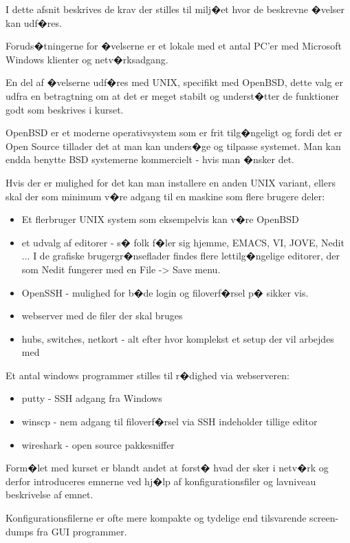 \documentclass[a4paper,11pt,notitlepage]{oevelser}
\begin{document}
I dette afsnit beskrives de krav der stilles til milj�et hvor de
beskrevne �velser kan udf�res.

Foruds�tningerne for �velserne er et lokale med et antal PC'er
med Microsoft Windows klienter og netv�rksadgang.

En del af �velserne udf�res med UNIX, specifikt med OpenBSD, dette
valg er udfra en betragtning om at det er meget stabilt og
underst�tter de funktioner godt som beskrives i kurset.

OpenBSD er et moderne operativsystem som er frit tilg�ngeligt og fordi
det er Open Source tillader det at man kan unders�ge og tilpasse
systemet. Man kan endda benytte BSD systemerne kommercielt - hvis man
�nsker det.

Hvis der er mulighed for det kan man installere en anden UNIX variant,
ellers skal der som minimum v�re adgang til en
maskine som flere brugere deler:
\begin{itemize}
\item Et flerbruger UNIX system som eksempelvis kan v�re OpenBSD
\item et udvalg af editorer - s� folk f�ler sig hjemme, EMACS, VI,
  JOVE, Nedit ... I de grafiske brugergr�nseflader findes flere
  lettilg�ngelige  editorer, der som Nedit fungerer med en File ->
  Save menu.
\item OpenSSH - mulighed for b�de login og filoverf�rsel p� sikker vis.
\item webserver med de filer der skal bruges
\item hubs, switches, netkort - alt efter hvor komplekst et setup der
  vil arbejdes med
\end{itemize}

Et antal windows programmer stilles til r�dighed via webserveren:
\begin{itemize}
\item putty - SSH adgang fra Windows
\item winscp - nem adgang til filoverf�rsel via SSH indeholder tillige editor
\item wireshark - open source pakkesniffer
\end{itemize}


Form�let med kurset er blandt andet at forst� hvad der sker i netv�rk
og derfor introduceres emnerne ved hj�lp af konfigurationsfiler og
lavniveau beskrivelse af emnet.

Konfigurationsfilerne er ofte mere kompakte og tydelige end
tilsvarende screen-dumps fra GUI programmer.
\end{document}
